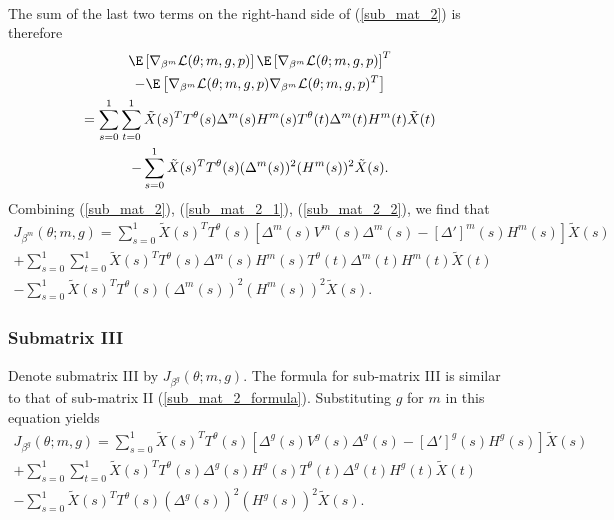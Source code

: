 \documentclass[12pt]{article}
\begin{document}
\begin{appendices}
\begin{multline*}
\end{multline*}
The sum of the last two terms on the right-hand side of (\ref{sub_mat_2}) is therefore
\begin{multline}\label{sub_mat_2_2}
 \E \left[ \nabla_{\beta^m} \mathcal{L}(\theta; m, g, p) \right] \E \left[ \nabla_{\beta^m} \mathcal{L}(\theta; m, g, p) \right]^T \\ - \E \left[\nabla_{\beta^m} \mathcal{L}(\theta; m, g, p) \nabla_{\beta^m} \mathcal{L}(\theta; m, g, p)^T \right] \\ =
\sum_{s=0}^1 \sum_{t=0}^1 \tilde{X}(s)^T {T}^\theta(s) {\Delta}^m(s) {H}^m(s) T^{\theta}(t) {\Delta}^m(t) {H}^m(t) \tilde{X}(t) \\ - \sum_{s=0}^1 \tilde{X}(s)^T {T}^\theta(s) ({\Delta}^m(s))^2 ({H}^m(s))^2 \tilde{X}(s). \end{multline}
Combining (\ref{sub_mat_2}), (\ref{sub_mat_2_1}), (\ref{sub_mat_2_2}), we find that
\begin{multline}\label{sub_mat_2_formula}
J_{\beta^m}(\theta; m, g) = \sum_{s=0}^1 \tilde{X}(s)^T T^{\theta}(s) \left[ {\Delta}^m(s) {V}^m(s) {\Delta}^m(s) - [{\Delta}']^m(s) {H}^m(s) \right] \tilde{X}(s) \\ + \sum_{s=0}^1 \sum_{t=0}^1 \tilde{X}(s)^T {T}^\theta(s) {\Delta}^m(s) {H}^m(s) {T}^\theta(t) {\Delta}^m(t) {H}^m(t) \tilde{X}(t) \\ - \sum_{s=0}^1 \tilde{X}(s)^T T^{\theta}(s) ({\Delta}^m(s))^2 ({H}^m(s))^2 \tilde{X}(s).
\end{multline}

\subsubsection*{Submatrix III}
Denote submatrix III by $J_{\beta^g}(\theta; m, g).$ The formula for sub-matrix III is similar to that of sub-matrix II (\ref{sub_mat_2_formula}). Substituting $g$ for $m$ in this equation yields
\begin{multline}\label{sub_mat_3_formula}
J_{\beta^g}(\theta; m, g) = \sum_{s=0}^1 \tilde{X}(s)^T T^{\theta}(s) \left[{\Delta}^g(s) {V}^g(s) {\Delta}^g(s) - [{\Delta}']^g(s) {H}^g(s) \right] \tilde{X}(s) \\ + \sum_{s=0}^1 \sum_{t=0}^1 \tilde{X}(s)^T {T}^\theta(s) {\Delta}^g(s) {H}^g(s) {T}^\theta(t) {\Delta}^g(t) {H}^g(t) \tilde{X}(t) \\ - \sum_{s=0}^1 \tilde{X}(s)^T T^{\theta}(s) ({\Delta}^g(s))^2 ({H}^g(s))^2 \tilde{X}(s).
\end{multline}


\end{appendices}
\end{document}
